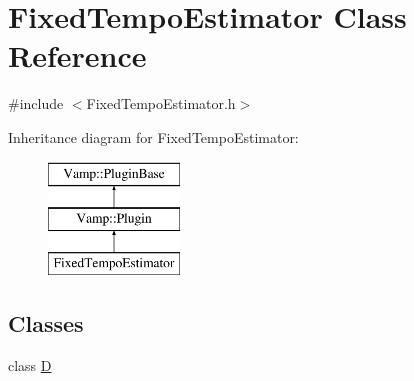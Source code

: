 \hypertarget{class_fixed_tempo_estimator}{}\section{Fixed\+Tempo\+Estimator Class Reference}
\label{class_fixed_tempo_estimator}


{\ttfamily \#include $<$Fixed\+Tempo\+Estimator.\+h$>$}

Inheritance diagram for Fixed\+Tempo\+Estimator\+:\begin{figure}[H]
\begin{center}
\leavevmode
\includegraphics[height=3.000000cm]{class_fixed_tempo_estimator}
\end{center}
\end{figure}
\subsection*{Classes}
\begin{DoxyCompactItemize}
\item 
class \hyperlink{class_fixed_tempo_estimator_1_1_d}{D}
\end{DoxyCompactItemize}
